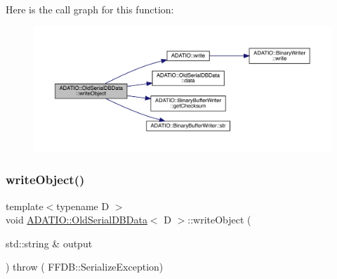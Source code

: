Here is the call graph for this function\+:
\nopagebreak
\begin{figure}[H]
\begin{center}
\leavevmode
\includegraphics[width=350pt]{da/dbc/classADATIO_1_1OldSerialDBData_aec52af4bfb6beb74fc039b9b25328270_cgraph}
\end{center}
\end{figure}
\mbox{\label{classADATIO_1_1OldSerialDBData_aec52af4bfb6beb74fc039b9b25328270}} 
\subsubsection{\texorpdfstring{writeObject()}{writeObject()}\hspace{0.1cm}{\footnotesize\ttfamily [2/3]}}
{\footnotesize\ttfamily template$<$typename D $>$ \\
void \mbox{\hyperlink{classADATIO_1_1OldSerialDBData}{A\+D\+A\+T\+I\+O\+::\+Old\+Serial\+D\+B\+Data}}$<$ D $>$\+::write\+Object (\begin{DoxyParamCaption}\item[{std\+::string \&}]{output }\end{DoxyParamCaption}) throw ( F\+F\+D\+B\+::\+Serialize\+Exception) \hspace{0.3cm}{\ttfamily [inline]}}

